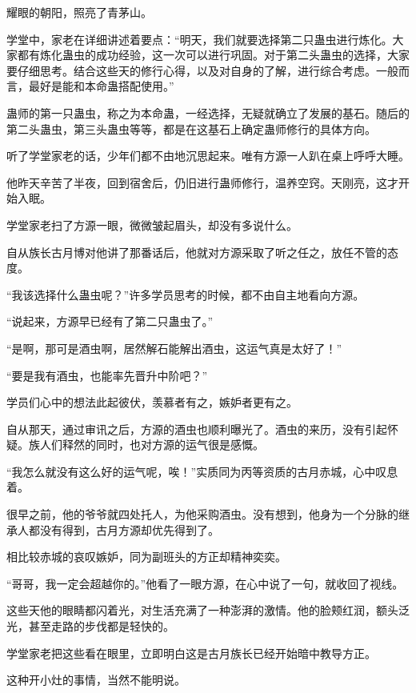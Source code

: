 
\begin{this_body}

耀眼的朝阳，照亮了青茅山。

学堂中，家老在详细讲述着要点：“明天，我们就要选择第二只蛊虫进行炼化。大家都有炼化蛊虫的成功经验，这一次可以进行巩固。对于第二头蛊虫的选择，大家要仔细思考。结合这些天的修行心得，以及对自身的了解，进行综合考虑。一般而言，最好是能和本命蛊搭配使用。”

蛊师的第一只蛊虫，称之为本命蛊，一经选择，无疑就确立了发展的基石。随后的第二头蛊虫，第三头蛊虫等等，都是在这基石上确定蛊师修行的具体方向。

听了学堂家老的话，少年们都不由地沉思起来。唯有方源一人趴在桌上呼呼大睡。

他昨天辛苦了半夜，回到宿舍后，仍旧进行蛊师修行，温养空窍。天刚亮，这才开始入眠。

学堂家老扫了方源一眼，微微皱起眉头，却没有多说什么。

自从族长古月博对他讲了那番话后，他就对方源采取了听之任之，放任不管的态度。

“我该选择什么蛊虫呢？”许多学员思考的时候，都不由自主地看向方源。

“说起来，方源早已经有了第二只蛊虫了。”

“是啊，那可是酒虫啊，居然解石能解出酒虫，这运气真是太好了！”

“要是我有酒虫，也能率先晋升中阶吧？”

学员们心中的想法此起彼伏，羡慕者有之，嫉妒者更有之。

自从那天，通过审讯之后，方源的酒虫也顺利曝光了。酒虫的来历，没有引起怀疑。族人们释然的同时，也对方源的运气很是感慨。

“我怎么就没有这么好的运气呢，唉！”实质同为丙等资质的古月赤城，心中叹息着。

很早之前，他的爷爷就四处托人，为他采购酒虫。没有想到，他身为一个分脉的继承人都没有得到，古月方源却优先得到了。

相比较赤城的哀叹嫉妒，同为副班头的方正却精神奕奕。

“哥哥，我一定会超越你的。”他看了一眼方源，在心中说了一句，就收回了视线。

这些天他的眼睛都闪着光，对生活充满了一种澎湃的激情。他的脸颊红润，额头泛光，甚至走路的步伐都是轻快的。

学堂家老把这些看在眼里，立即明白这是古月族长已经开始暗中教导方正。

这种开小灶的事情，当然不能明说。


\end{this_body}
